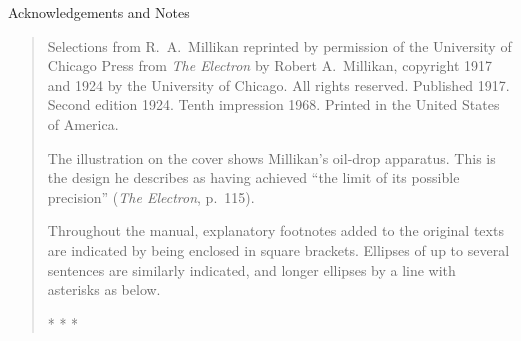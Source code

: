 \vspace*{3in}
Acknowledgements and Notes


\begin{quote}
Selections from R.\ A.\ Millikan reprinted by permission of the University of Chicago Press from \emph{The Electron} by Robert A.\ Millikan, copyright 1917 and 1924 by the University of Chicago.  All rights reserved.  Published 1917.  Second edition 1924.  Tenth impression 1968.  Printed in the United States of America.



The illustration on the cover shows Millikan’s oil-drop apparatus.  This is the design he describes as having achieved “the limit of its possible precision” (\emph{The Electron}, p.\ 115).  

Throughout the manual, explanatory footnotes added to the original texts are indicated by being enclosed in square brackets. Ellipses of up to several sentences are similarly indicated, and longer ellipses by a line with asterisks as below.

\vspace*{11pt}

\centerline{* * *}


\end{quote}